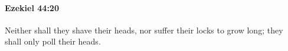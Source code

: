 
		\paragraph{Ezekiel 44:20} %
			\label{EZEKIEL-44-20}

			Neither shall they shave their heads, nor suffer their locks to grow long; they shall only poll their heads.


